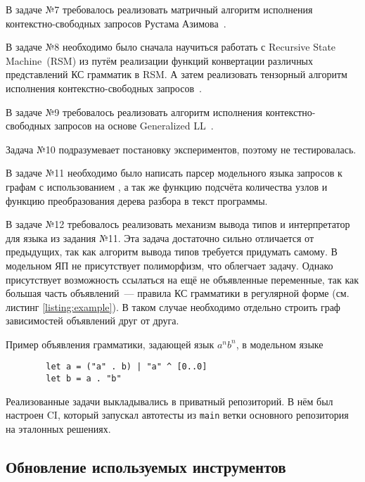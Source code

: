 В задаче №7 требовалось реализовать матричный алгоритм исполнения контекстно-свободных запросов Рустама Азимова~\cite{azimovContextfreePathQuerying2018}.

В задаче №8 необходимо было сначала научиться работать с Recursive State Machine~(RSM) из \pyformlang{} путём реализации функций конвертации различных представлений КС грамматик в RSM.
А затем реализовать тензорный алгоритм исполнения контекстно-свободных запросов~\cite{orachevContextFreePathQuerying2020, shemetovaOneAlgorithmEvaluate2021}.

В задаче №9 требовалось реализовать алгоритм исполнения контекстно-свободных запросов на основе Generalized LL~\cite{abzalovGLLbasedContextFreePath2023}.

Задача №10 подразумевает постановку экспериментов, поэтому не тестировалась.

В задаче №11 необходимо было написать парсер модельного языка запросов к графам с использованием \antlr{}, а так же функцию подсчёта количества узлов и функцию преобразования дерева разбора в текст программы.

В задаче №12 требовалось реализовать механизм вывода типов и интерпретатор для языка из задания №11.
Эта задача достаточно сильно отличается от предыдущих, так как алгоритм вывода типов требуется придумать самому.
В модельном ЯП не присутствует полиморфизм, что облегчает задачу.
Однако присутствует возможность ссылаться на ещё не объявленные переменные, так как большая часть объявлений~--- правила КС грамматики в регулярной форме (см. листинг \ref{listing:example}).
В таком случае необходимо отдельно строить граф зависимостей объявлений друг от друга.

\begin{listing}
    \caption{Пример объявления грамматики, задающей язык $a^n b^n$, в модельном языке}
    \begin{verbatim}
        let a = ("a" . b) | "a" ^ [0..0]
        let b = a . "b"
        \end{verbatim}
    \label{listing:example}
\end{listing}

Реализованные задачи выкладывались в приватный репозиторий.
В нём был настроен CI, который запускал автотесты из \texttt{main} ветки основного репозитория на эталонных решениях.

\subsection{Обновление используемых инструментов}
\label{subsec:housekeeping}

